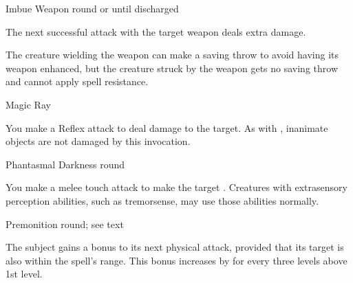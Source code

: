 \begin{spellsection}{Imbue Weapon}
     round or until discharged
    \begin{spelleffect}
        The next successful attack with the target weapon deals extra damage.
    \end{spelleffect}
    \begin{spellnotes} 
        The creature wielding the weapon can make a saving throw to avoid having its weapon enhanced, but the creature struck by the weapon gets no saving throw and cannot apply spell resistance.
    \end{spellnotes}
\end{spellsection}

\begin{spellsection}{Magic Ray}
    \begin{spelleffect}
        You make a Reflex attack to deal damage to the target. As with , inanimate objects are not damaged by this invocation.
    \end{spelleffect}
\end{spellsection}

\begin{spellsection}{Phantasmal Darkness}
     round
    \begin{spelleffect}
        You make a melee touch attack to make the target \blinded. Creatures with extrasensory perception abilities, such as tremorsense, may use those abilities normally.
    \end{spelleffect}
\end{spellsection}

\begin{spellsection}{Premonition}
     round; see text
    \begin{spelleffect}
        The subject gains a  bonus to its next physical attack, provided that its target is also within the spell's range. This bonus increases by  for every three levels above 1st level.
    \end{spelleffect}
\end{spellsection}

